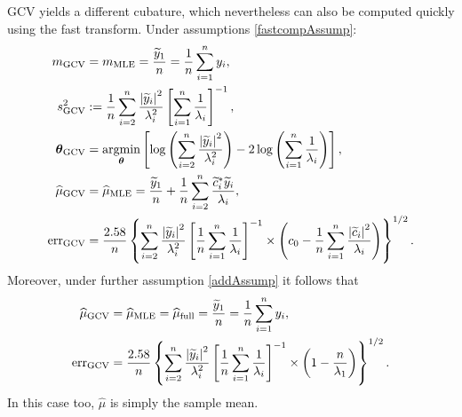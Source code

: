 \documentclass{iitthesis}          %
\newcommand{\bm}[1]{\boldsymbol{#1}}
\newcommand{\vtheta}{{\bm{\theta}}}
\newcommand{\hmu}{\widehat{\mu}}
\newcommand{\MLE}{\textup{MLE}}
\newcommand{\GCV}{\textup{GCV}}
\newcommand{\err}{\textup{err}}
\def\abs#1{\ensuremath{\left \lvert #1 \right \rvert}}
\providecommand{\argmin}{\operatorname*{argmin}}
\begin{document}
GCV yields a different cubature, which nevertheless can also be computed quickly using the fast transform.  Under assumptions \eqref{fastcompAssump}:
\begin{align}
\nonumber
m_{\textup{GCV}} & = m_\MLE =  \frac{\widetilde{y}_1}{n} = \frac 1n \sum_{i=1}^n y_i,\\
\nonumber 
s^2_{\textup{GCV}} & : =  \frac 1{n} \sum_{i=2}^n \frac{\abs{\widetilde{y}_i}^2}{\lambda_i^2}  \left [ \sum_{i=1}^n \frac{1}{\lambda_i} \right]^{-1}, \\
\label{thetaGCV}
\vtheta_{\GCV} 
&= \argmin_\vtheta \left[ \log \left ( \sum_{i=2}^n \frac{\abs{\widetilde{y}_i}^2}{\lambda_i^2} 
\right) -2\log\left( \sum_{i=1}^n \frac{1}{\lambda_i} \right)
\right], \\
\nonumber
\hmu_{\GCV}
&= \hmu_\MLE  = \frac{\widetilde{y}_1}{n} +
\frac 1n \sum_{i=2}^n \frac{ \widetilde{c}_i^* \widetilde{y}_i}{\lambda_i}, \\
\nonumber
\err_{\textup{GCV}} & =
\frac{2.58}{n}\left\{\sum_{i=2}^n \frac{\abs{\widetilde{y}_i}^2}{\lambda_i^2}  \left [ \frac 1n \sum_{i=1}^n \frac{1}{\lambda_i} \right]^{-1}  \times
\left( c_0 - \frac 1n \sum_{i=1}^n \frac{\abs{\widetilde{c}_i}^2}{\lambda_i} \right) 
\right\}^{1/2}.
\end{align}
Moreover, under further assumption \eqref{addAssump} it follows that 
\begin{align}
\nonumber %
\hmu_{\textup{GCV}}
&= \hmu_\MLE = \hmu_{\textup{full}} =
\frac{\widetilde{y}_1}{n} = \frac 1n \sum_{i=1}^n y_i,\\
\label{errGCVSimple}
\err_{\textup{GCV}} & =
\frac{2.58}{n}\left\{\sum_{i=2}^n \frac{\abs{\widetilde{y}_i}^2}{\lambda_i^2}  \left [ \frac 1n \sum_{i=1}^n \frac{1}{\lambda_i} \right]^{-1}  \times
\left( 1 -  \frac{n}{\lambda_1} \right)  
\right\}^{1/2}.
\end{align}
In this case too, $\hmu$ is simply the sample mean.
\end{document}
